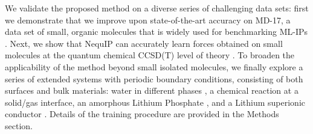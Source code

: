 \documentclass[%
reprint,
superscriptaddress,
nofootinbib,
amsmath,amssymb,
aps,
prl,
]{revtex4-1}
\begin{document}
We validate the proposed method on a diverse series of challenging data sets: first we demonstrate that we improve upon state-of-the-art accuracy on MD-17, a data set of small, organic molecules that is widely used for benchmarking ML-IPs \cite{chmiela2017machine, schutt2017quantum, sgdml, schnet_neurips, klicpera2020directional}. Next, we show that NequIP can accurately learn forces obtained on small molecules at the quantum chemical CCSD(T) level of theory \cite{sgdml}. To broaden the applicability of the method beyond small isolated molecules, we finally explore a series of extended systems with periodic boundary conditions, consisting of both surfaces and bulk materials: water in different phases \cite{deepmd, deepmd_water_paper}, a chemical reaction at a solid/gas interface, an amorphous Lithium Phosphate \cite{dcf}, and a Lithium superionic conductor \cite{gnnff}. Details of the training procedure are provided in the Methods section.
\end{document}
